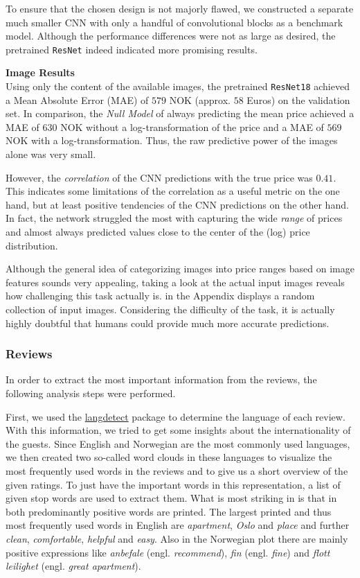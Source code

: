 To ensure that the chosen design is not majorly flawed, we constructed a separate much smaller CNN with only a handful of convolutional blocks as a benchmark model.
Although the performance differences were not as large as desired, the pretrained \texttt{ResNet} indeed indicated more promising results.


\textbf{Image Results} \\
Using only the content of the available images, the pretrained \texttt{ResNet18} achieved a Mean Absolute Error (MAE) of $579$ NOK (approx. $58$ Euros) on the validation set.
In comparison, the \emph{Null Model} of always predicting the mean price achieved a MAE of $630$ NOK without a log-transformation of the price and a MAE of $569$ NOK with a log-transformation.
Thus, the raw predictive power of the images alone was very small.

However, the \emph{correlation} of the CNN predictions with the true price was $0.41$.
This indicates some limitations of the correlation as a useful metric on the one hand, but at least positive tendencies of the CNN predictions on the other hand.
In fact, the network struggled the most with capturing the wide \emph{range} of prices and almost always predicted values close to the center of the (log) price distribution.

Although the general idea of categorizing images into price ranges based on image features sounds very appealing, taking a look at the actual input images reveals how challenging this task actually is.
 in the Appendix displays a random collection of input images.
Considering the difficulty of the task, it is actually highly doubtful that humans could provide much more accurate predictions.


\subsubsection{Reviews}

In order to extract the most important information from the reviews, the following analysis steps were performed.

First, we used the \href{https://pypi.org/project/langdetect/}{langdetect} package to determine the language of each review.
With this information, we tried to get some insights about the internationality of the guests.
Since English and Norwegian are the most commonly used languages, we then created two so-called word clouds in these languages to visualize the most frequently used words in the reviews and to give us a short overview of the given ratings.
To just have the important words in this representation, a list of given stop words are used to extract them.
What is most striking in  is that in both predominantly positive words are printed.
The largest printed and thus most frequently used words in English are \textit{apartment}, \textit{Oslo} and \textit{place} and further \textit{clean}, \textit{comfortable}, \textit{helpful} and \textit{easy}.
Also in the Norwegian plot there are mainly positive expressions like \textit{anbefale} (engl. \emph{recommend}), \textit{fin} (engl. \emph{fine}) and \textit{flott leilighet} (engl. \emph{great apartment}).

